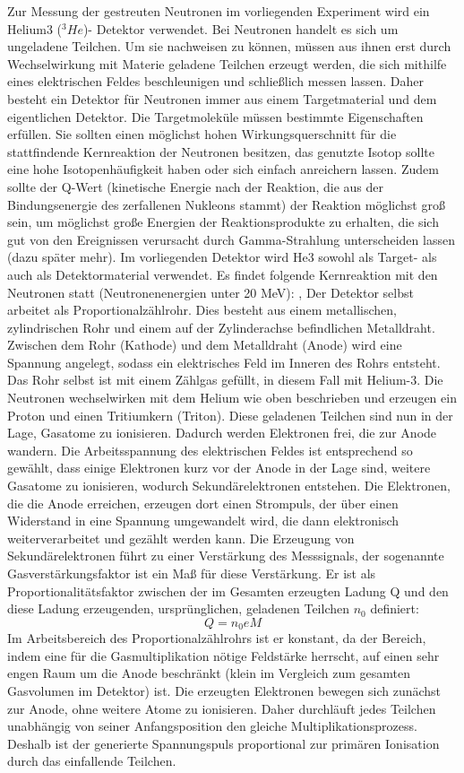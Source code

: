 Zur Messung der gestreuten Neutronen im vorliegenden Experiment wird ein Helium3 ($^3He$)- Detektor verwendet. Bei Neutronen handelt es sich um ungeladene Teilchen. Um sie nachweisen zu können, müssen aus ihnen erst durch Wechselwirkung mit Materie geladene Teilchen erzeugt werden, die sich mithilfe eines elektrischen Feldes beschleunigen und schließlich messen lassen. Daher besteht ein Detektor für Neutronen immer aus einem Targetmaterial und dem eigentlichen Detektor. Die Targetmoleküle müssen bestimmte Eigenschaften erfüllen. Sie sollten einen möglichst hohen Wirkungsquerschnitt für die stattfindende Kernreaktion der Neutronen besitzen, das genutzte Isotop sollte eine hohe Isotopenhäufigkeit haben oder sich einfach anreichern lassen. Zudem sollte der Q-Wert (kinetische Energie nach der Reaktion, die aus der Bindungsenergie des zerfallenen Nukleons stammt) der Reaktion möglichst groß sein, um möglichst große Energien der Reaktionsprodukte zu erhalten, die sich gut von den Ereignissen verursacht durch Gamma-Strahlung unterscheiden lassen (dazu später mehr). Im vorliegenden Detektor wird He3 sowohl als Target- als auch als Detektormaterial verwendet. Es findet folgende Kernreaktion mit den Neutronen statt (Neutronenenergien unter 20 MeV): 
, 
Der Detektor selbst arbeitet als Proportionalzählrohr. Dies besteht aus einem metallischen, zylindrischen Rohr und einem auf der Zylinderachse befindlichen Metalldraht. Zwischen dem Rohr (Kathode) und dem Metalldraht (Anode) wird eine Spannung angelegt, sodass ein elektrisches Feld im Inneren des Rohrs entsteht. Das Rohr selbst ist mit einem Zählgas gefüllt, in diesem Fall mit Helium-3. Die Neutronen wechselwirken mit dem Helium wie oben beschrieben und erzeugen ein Proton und einen Tritiumkern (Triton). Diese geladenen Teilchen sind nun in der Lage, Gasatome zu ionisieren. Dadurch werden Elektronen frei, die zur Anode wandern. Die Arbeitsspannung des elektrischen Feldes ist entsprechend so gewählt, dass einige Elektronen kurz vor der Anode in der Lage sind, weitere Gasatome zu ionisieren, wodurch Sekundärelektronen entstehen. Die Elektronen, die die Anode erreichen, erzeugen dort einen Strompuls, der über einen Widerstand in eine Spannung umgewandelt wird, die dann elektronisch weiterverarbeitet und gezählt werden kann. Die Erzeugung von Sekundärelektronen führt zu einer Verstärkung des Messsignals, der sogenannte Gasverstärkungsfaktor ist ein Maß für diese Verstärkung. Er ist als Proportionalitätsfaktor zwischen der im Gesamten erzeugten Ladung Q und den diese Ladung erzeugenden, ursprünglichen, geladenen Teilchen $n_0$ definiert: 
\begin{equation*}
Q = n_0 e M
\end{equation*}
Im Arbeitsbereich des Proportionalzählrohrs ist er konstant, da der Bereich, indem eine für die Gasmultiplikation nötige Feldstärke herrscht, auf einen sehr engen Raum um die Anode beschränkt (klein im Vergleich zum gesamten Gasvolumen im Detektor) ist. Die erzeugten Elektronen bewegen sich zunächst zur Anode, ohne weitere Atome zu ionisieren. Daher durchläuft jedes Teilchen unabhängig von seiner Anfangsposition den gleiche Multiplikationsprozess. Deshalb ist der generierte Spannungspuls proportional zur primären Ionisation durch das einfallende Teilchen.

